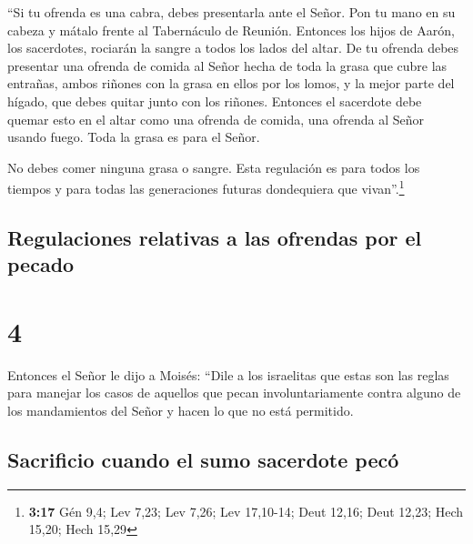  ``Si tu ofrenda es una cabra, debes presentarla ante el
Señor.  Pon tu mano en su cabeza y mátalo frente al
Tabernáculo de Reunión. Entonces los hijos de Aarón, los sacerdotes,
rociarán la sangre a todos los lados del altar.  De tu
ofrenda debes presentar una ofrenda de comida al Señor hecha de toda la
grasa que cubre las entrañas,  ambos riñones con la grasa
en ellos por los lomos, y la mejor parte del hígado, que debes quitar
junto con los riñones.  Entonces el sacerdote debe quemar
esto en el altar como una ofrenda de comida, una ofrenda al Señor usando
fuego. Toda la grasa es para el Señor.

 No debes comer ninguna grasa o sangre. Esta regulación
es para todos los tiempos y para todas las generaciones futuras
dondequiera que vivan''.\footnote{\textbf{3:17} Gén 9,4; Lev 7,23; Lev
  7,26; Lev 17,10-14; Deut 12,16; Deut 12,23; Hech 15,20; Hech 15,29}

\hypertarget{regulaciones-relativas-a-las-ofrendas-por-el-pecado}{%
\subsection{Regulaciones relativas a las ofrendas por el
pecado}\label{regulaciones-relativas-a-las-ofrendas-por-el-pecado}}

\hypertarget{section-3}{%
\section{4}\label{section-3}}

 Entonces el Señor le dijo a Moisés:  ``Dile
a los israelitas que estas son las reglas para manejar los casos de
aquellos que pecan involuntariamente contra alguno de los mandamientos
del Señor y hacen lo que no está permitido.

\hypertarget{sacrificio-cuando-el-sumo-sacerdote-pecuxf3}{%
\subsection{Sacrificio cuando el sumo sacerdote
pecó}\label{sacrificio-cuando-el-sumo-sacerdote-pecuxf3}}

